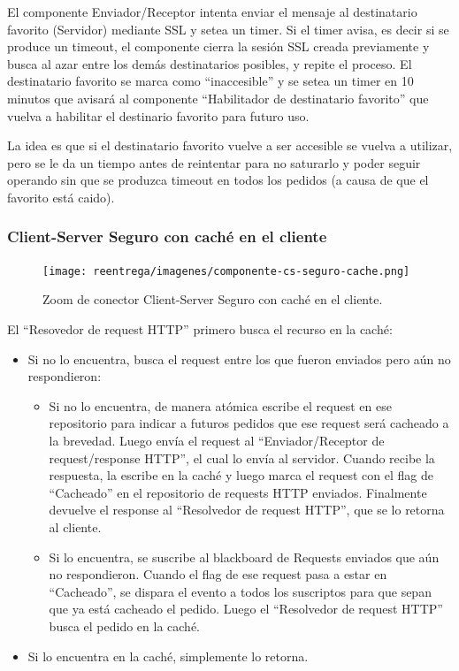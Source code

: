 El componente Enviador/Receptor intenta enviar el mensaje
al destinatario favorito (Servidor) mediante SSL y setea un timer.
Si el timer avisa, es decir si se produce un timeout, el componente
cierra la sesión SSL creada previamente y busca al azar entre los
demás destinatarios posibles, y repite el proceso. El destinatario
favorito se marca como ``inaccesible'' y se setea un timer en 10
minutos que avisará al componente ``Habilitador de destinatario
favorito'' que vuelva a habilitar el destinario favorito para
futuro uso.

La idea es que si el destinatario favorito vuelve a ser accesible se
vuelva a utilizar, pero se le da un tiempo antes de reintentar para
no saturarlo y poder seguir operando sin que se produzca timeout
en todos los pedidos (a causa de que el favorito está caido).

\subsubsection{Client-Server Seguro con caché en el cliente}

\begin{figure}[H]
   \centering
   \texttt{[image: reentrega/imagenes/componente-cs-seguro-cache.png]}
   \caption{Zoom de conector Client-Server Seguro con caché en el cliente.}
\end{figure}

El ``Resovedor de request HTTP'' primero busca el recurso en la caché:
\begin{itemize}
	\item Si no lo encuentra, busca el request entre los que fueron enviados pero aún no respondieron:
	\begin{itemize}
		\item Si no lo encuentra, de manera atómica escribe el request en ese repositorio para indicar a futuros
        pedidos que ese request será cacheado a la brevedad. Luego envía el request al ``Enviador/Receptor de
        request/response HTTP'', el cual lo envía al servidor. Cuando recibe la respuesta, la escribe en la caché
        y luego marca el request con el flag de ``Cacheado'' en el repositorio de requests HTTP enviados. Finalmente
        devuelve el response al ``Resolvedor de request HTTP'', que se lo retorna al cliente.
        
        \item Si lo encuentra, se suscribe al blackboard de Requests enviados que aún no respondieron.
        Cuando el flag de ese request pasa a estar en ``Cacheado'', se dispara el evento
        a todos los suscriptos para que sepan que ya está cacheado el pedido. Luego el ``Resolvedor de
        request HTTP'' busca el pedido en la caché.
	\end{itemize}
	
	\item  Si lo encuentra en la caché, simplemente lo retorna.
\end{itemize}

